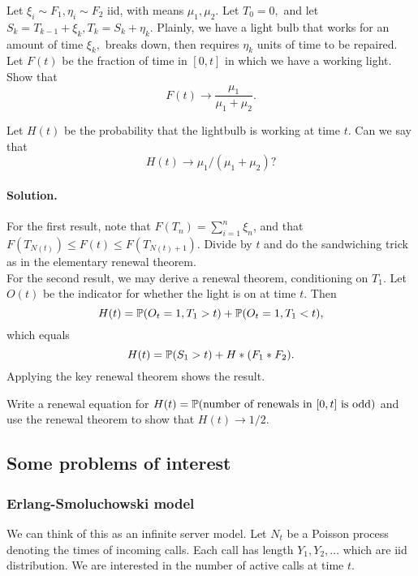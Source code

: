 \documentclass[12pt]{article}
\begin{document}
\begin{exercise}
Let $\xi_i \sim F_1, \eta_i \sim F_2$ iid, with means $\mu_1,\mu_2$. Let $T_0 = 0,$ and let $S_k = T_{k-1} + \xi_k, T_k = S_k + \eta_k.$ Plainly, we have a light bulb that works for an amount of time $\xi_k,$ breaks down, then requires $\eta_k$ units of time to be repaired.\\

Let $F(t)$ be the fraction of time in $[0,t]$ in which we have a working light. Show that
\[
F(t) \rightarrow \frac{\mu_1}{\mu_1 + \mu_2}.
\]

Let $H(t)$ be the probability that the lightbulb is working at time $t$. Can we say that 
\[
H(t) \rightarrow \mu_1/(\mu_1 + \mu_2)?
\]

\paragraph{Solution.}
For the first result, note that $F(T_n) = \sum_{i=1}^n \xi_n$, and that $F(T_{N(t)}) \leq F(t) \leq F(T_{N(t)+1})$. Divide by $t$ and do the sandwiching trick as in the elementary renewal theorem.\\

For the second result, we may derive a renewal theorem, conditioning on $T_1$. Let $O(t)$ be the indicator for whether the light is on at time $t$. Then
\[
H(t) = \mathbb{P}(O_t = 1, T_1 > t) + \mathbb{P}(O_t = 1, T_1 < t), 
\]
which equals 
\[
H(t) = \mathbb{P}(S_1 > t) + H *(F_1*F_2).
\]
Applying the key renewal theorem shows the result.
\end{exercise}

\begin{exercise}
    Write a renewal equation for $H(t) = \mathbb{P}(\text{number of renewals in } [0,t] \text{ is odd})$ and use the renewal theorem to show that $H(t) \rightarrow 1/2.$
\end{exercise}

\newpage

\subsection{Some problems of interest}

\subsubsection{Erlang-Smoluchowski model} We can think of this as an infinite server model. Let $N_t$ be a Poisson process denoting the times of incoming calls. Each call has length $Y_1,Y_2,\dots$ which are iid distribution. We are interested in the number of active calls at time $t.$\\
\end{document}
